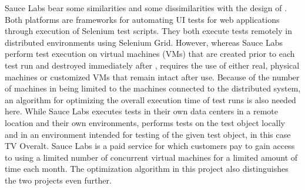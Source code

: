 Sauce Labs bear some similarities and some dissimilarities with the design of \toolname. Both platforms are frameworks for automating UI tests for web applications through execution of Selenium test scripts. They both execute tests remotely in distributed environments using Selenium Grid. However, whereas Sauce Labs perform test execution on virtual machines (VMs) that are created prior to each test run and destroyed immediately after \cite{SauceLabsFeatures}, \toolname \space requires the use of either real, physical machines or customized VMs that remain intact after use. Because of the number of machines in \toolname \space being limited to the machines connected to the distributed system, an algorithm for optimizing the overall execution time of test runs is also needed here. While Sauce Labs executes tests in their own data centers in a remote location and their own environments, \toolname \space performs tests on the test object locally and in an environment intended for testing of the given test object, in this case TV Overalt. Sauce Labs is a paid service for which customers pay to gain access to using a limited number of concurrent virtual machines for a limited amount of time each month. The optimization algorithm in this project also distinguishes the two projects even further.

